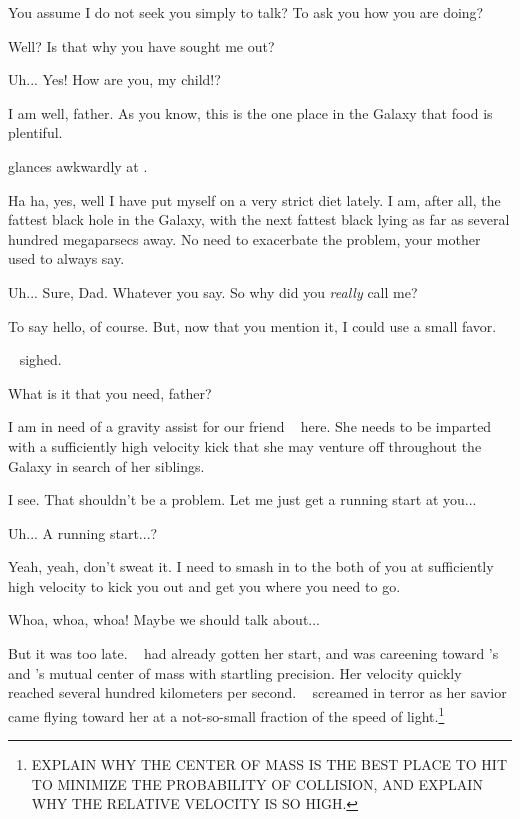 \documentclass[main.tex]{subfiles}
\begin{document}
\newpara \Chiron You assume I do not seek you simply to talk?  To ask you how you are doing?

\newpara \Hippe Well?  Is that why you have sought me out?

\newpara \Chiron Uh... Yes!  How are you, my child!?

\newpara \Hippe I am well, father.  As you know, this is the one place in the Galaxy that food is plentiful.  

\newpara \nar \rmchiron glances awkwardly at \rmelectra.


\newpara \Chiron Ha ha, yes, well I have put myself on a very strict diet lately.  I am, after all, the fattest black hole in the Galaxy, with the next fattest black lying as far as several hundred megaparsecs away.  No need to exacerbate the problem, your mother used to always say.

\newpara \Hippe Uh... Sure, Dad.  Whatever you say.  So why did you \textit{really} call me?

\newpara \Chiron To say hello, of course.  But, now that you mention it, I could use a small favor.  

\newpara \nar \rmhippe~ sighed.

\newpara \Hippe What is it that you need, father?

\newpara \Chiron I am in need of a gravity assist for our friend \rmelectra~ here.  She needs to be imparted with a sufficiently high velocity kick that she may venture off throughout the Galaxy in search of her siblings.

\newpara \Hippe I see.  That shouldn't be a problem.  Let me just get a running start at you...

\newpara \Electra Uh... A running start...?

\newpara \Hippe Yeah, yeah, don't sweat it.  I need to smash in to the both of you at sufficiently high velocity to kick you out and get you where you need to go.

\newpara \Electra Whoa, whoa, whoa!  Maybe we should talk about...

\newpara \nar But it was too late.  \rmhippe~ had already gotten her start, and was careening toward \rmelectra's and \rmchiron's mutual center of mass with startling precision.  Her velocity quickly reached several hundred kilometers per second.  \rmelectra~ screamed in terror as her savior came flying toward her at a not-so-small fraction of the speed of light.\footnote{EXPLAIN WHY THE CENTER OF MASS IS THE BEST PLACE TO HIT TO MINIMIZE THE PROBABILITY OF COLLISION, AND EXPLAIN WHY THE RELATIVE VELOCITY IS SO HIGH.}
\end{document}
